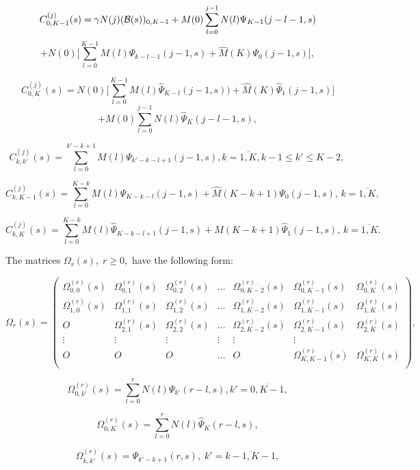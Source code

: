 \documentclass[12pt, a4paper]{article}
\begin{document}
$$ C_{0,K-1}^{(j)}(s)=\gamma N(j)({\cal B}(s))_{0,K-1} +
M(0)\sum\limits_{l=0}^{j-1}N(l)\Psi_{K-1}(j-l-1,s)
$$
$$
+N(0)\biggl[\sum\limits_{l=0}^{K-1}
M(l)  \Psi_{k-l-1}(j-1,s)+\hat{M}(K)\Psi_0(j-1,s)\biggr],
$$


$$
 C_{0,K}^{(j)}(s)= N(0)\biggl[\sum\limits_{l=0}^{K-1} M(l){\hat\Psi}_{K-l}(j-1,s))+
 \hat{M}(K){\hat\Psi}_1(j-1,s)\biggr ]$$$$
 + M(0)\sum\limits_{l=0}^{j-1}N(l){\hat\Psi}_K(j-l-1, s),
$$

$$
 C_{k,k'}^{(j)}(s)=
 \sum\limits_{l=0}^{k'-k+1} M(l)\Psi_{k'-k-l+1}(j-1, s),
 k=\overline{1,K}, k-1\leq k'\leq K-2, \,
$$

$$
 C_{k,K-1}^{(j)}(s)= \sum\limits_{l=0}^{K-k} M(l)\Psi_{K-k-l}(j-1,s)+
  \hat{M}(K-k+1)\Psi_0(j-1,s),\,
 k=\overline{1,K},
$$

$$
C_{k,K}^{(j)}(s)= \sum\limits_{l=0}^{K-k}M(l) {\hat\Psi}_{K-k-l+1}(j-1, s)
+ \hat{M}(K-k+1){\hat\Psi}_1(j-1,s),  \,
 k=\overline{1, K}.
$$


The matrices $\Omega_{r}(s),\;  r\geq0,$ have the following form:


 $$
     \Omega_r(s) =\left(\begin{array}{ccccccc}
       \Omega_{0,0}^{(r)}(s)     & \Omega_{0,1}^{(r)}(s)    &  \Omega_{0,2}^{(r)}(s)  & \ldots  &  \Omega_{0,K-2}^{(r)}(s)&    \Omega_{0,K-1}^{(r)}(s)&   \Omega_{0,K}^{(r)}(s)  \\
       \Omega_{1,0}^{(r)}(s)    &       \Omega_{1,1}^{(r)}(s)     &  \Omega_{1,2}^{(r)}(s)    &  \ldots  &   \Omega_{1,K-2}^{(r)}(s)& \Omega_{1,K-1}^{(r)}(s)&   \Omega_{1,K}^{(r)}(s) \\
       O&  \Omega_{2,1}^{(r)}(s)    &       \Omega_{2,2}^{(r)}(s)        &  \ldots  &   \Omega_{2,K-2}^{(r)}(s)& \Omega_{2,K-1}^{(r)}(s)&   \Omega_{2,K}^{(r)}(s)   \\
             \vdots & \vdots &\vdots& \vdots& \vdots& \vdots         \\
              O& O    &      O        &  \ldots  &    O& \Omega_{K,K-1}^{(r)}(s)&   \Omega_{K,K}^{(r)}(s)   \\
      \end{array} \right),
  $$

  $$
\Omega_{0,k'}^{(r)} (s)= \sum\limits_{l=0}^{r} N(l){\Psi_{k'}}(r-l,s),
k'=\overline{0,K-1},
$$

$$
\Omega_{0,K}^{(r)} (s)= \sum\limits_{l=0}^{r} N(l){\hat\Psi}_K(r-l,s),
$$

$$
\Omega_{k,k'}^{(r)} (s)= \Psi_{k'-k+1}(r,s),\;
 k'=\overline{k-1,K-1},
$$
\end{document}

